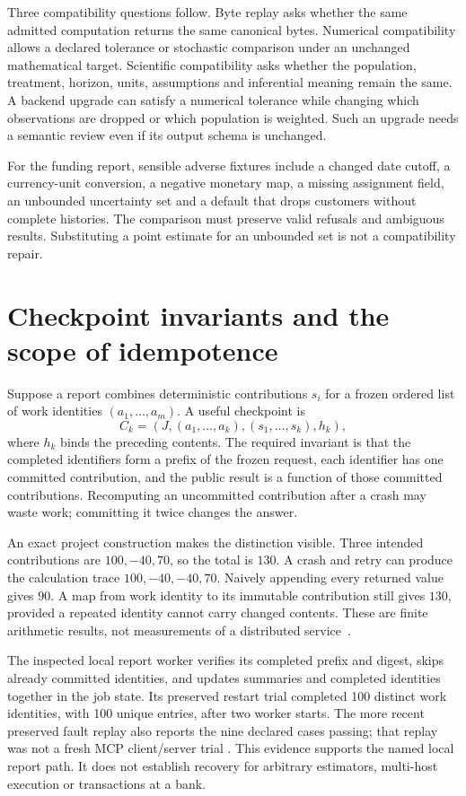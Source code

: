 Three compatibility questions follow. Byte replay asks whether the same
admitted computation returns the same canonical bytes. Numerical compatibility
allows a declared tolerance or stochastic comparison under an unchanged
mathematical target. Scientific compatibility asks whether the population,
treatment, horizon, units, assumptions and inferential meaning remain the
same. A backend upgrade can satisfy a numerical tolerance while changing
which observations are dropped or which population is weighted. Such an
upgrade needs a semantic review even if its output schema is unchanged.

For the funding report, sensible adverse fixtures include a changed date
cutoff, a currency-unit conversion, a negative monetary map, a missing
assignment field, an unbounded uncertainty set and a default that drops
customers without complete histories. The comparison must preserve valid
refusals and ambiguous results. Substituting a point estimate for an
unbounded set is not a compatibility repair.

\section{Checkpoint invariants and the scope of idempotence}

Suppose a report combines deterministic contributions $s_i$ for a frozen
ordered list of work identities $(a_1,\ldots,a_m)$. A useful checkpoint is
\[
 C_k=(J,(a_1,\ldots,a_k),(s_1,\ldots,s_k),h_k),
\]
where $h_k$ binds the preceding contents. The required invariant is that the
completed identifiers form a prefix of the frozen request, each identifier
has one committed contribution, and the public result is a function of those
committed contributions. Recomputing an uncommitted contribution after a
crash may waste work; committing it twice changes the answer.

An exact project construction makes the distinction visible. Three intended
contributions are $100,-40,70$, so the total is $130$. A crash and retry can
produce the calculation trace $100,-40,-40,70$. Naively appending every
returned value gives $90$. A map from work identity to its immutable
contribution still gives $130$, provided a repeated identity cannot carry
changed contents. These are finite arithmetic results, not measurements of
a distributed service~\citep{exec13_ops_exact}.

The inspected local report worker verifies its completed prefix and digest,
skips already committed identities, and updates summaries and completed
identities together in the job state. Its preserved restart trial completed
100 distinct work identities, with 100 unique entries, after two worker
starts. The more recent preserved fault replay also reports the nine declared
cases passing; that replay was not a fresh MCP client/server trial
\cite{exec13_ops_source,exec13_ops_faults}. This evidence supports the named
local report path. It does not establish recovery for arbitrary estimators,
multi-host execution or transactions at a bank.

